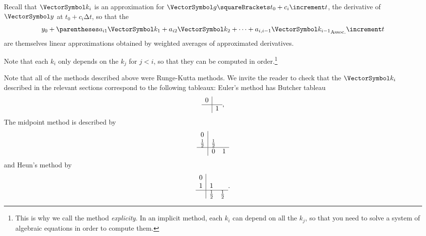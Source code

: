 \documentclass[10pt, a4paper, twoside]{basestyle}
\begin{document}
Recall that $\vk_i$ is an approximation for $\vg\of{t_0 + c_i\increment t}$, the derivative of $\vy$ at $t_0 + c_i\increment t$, so that the\[
y_0 + \pa{a_{i1}\vk_1 + a_{i2}\vk_2 + \dotsb + a_{i,i-1}\vk_{i-1}} \increment t
\] are themselves linear approximations obtained by weighted averages of approximated derivatives.

Note that each $k_i$ only depends on the $k_j$ for $j<i$, so that they can be computed in order.\footnote{This is why we call the method \emph{explicity}. In an implicit method, each $k_i$ can depend on all the $k_j$, so that you need to solve a system of algebraic equations in order to compute them.}

Note that all of the methods described above were Runge-Kutta methods. We invite the reader to check that the $\vk_i$ described in the relevant sections correspond to the following tableaux:
Euler's method has Butcher tableau\[
\begin{array}{c | c}
0    &    \\
\hline
     &  1  
\end{array}\text,
\]
The midpoint method is described by\[
\begin{array}{c | c c}
0           &                \\
\frac 1 2   &  \frac 1 2   & \\
\hline
            &  0           & 1  
\end{array}
\]
and Heun's method by\[
\begin{array}{c | c c}
0           &                \\
1           &  1           & \\
\hline
            &  \frac 1 2   & \frac 1 2
\end{array}\text.
\]
\end{document}
